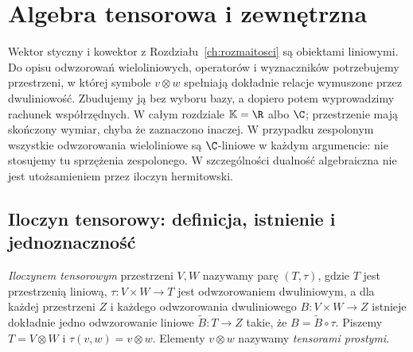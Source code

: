 \chapter{Algebra tensorowa i zewnętrzna}
\label{ch:algebra-tensorowa}

Wektor styczny i kowektor z Rozdziału~\ref{ch:rozmaitosci} są obiektami
liniowymi. Do opisu odwzorowań wieloliniowych, operatorów i
wyznaczników potrzebujemy przestrzeni, w której symbole
$v\otimes w$ spełniają dokładnie relacje wymuszone przez dwuliniowość.
Zbudujemy ją bez wyboru bazy, a dopiero potem wyprowadzimy rachunek
współrzędnych. W całym rozdziale $\mathbb K=\R$ albo $\C$;
przestrzenie mają skończony wymiar, chyba że zaznaczono inaczej.
W przypadku zespolonym wszystkie odwzorowania wieloliniowe są
$\C$-liniowe w każdym argumencie: nie stosujemy tu sprzężenia
zespolonego. W szczególności dualność algebraiczna nie jest
utożsamieniem przez iloczyn hermitowski.

\section{Iloczyn tensorowy: definicja, istnienie i jednoznaczność}
\label{sec:iloczyn-tensorowy}

\begin{definicja}
\label{def:tensor-universal}
\emph{Iloczynem tensorowym} przestrzeni $V,W$ nazywamy parę
$(T,\tau)$, gdzie $T$ jest przestrzenią liniową,
$\tau\colon V\times W\to T$ jest odwzorowaniem dwuliniowym,
a dla każdej przestrzeni $Z$ i każdego odwzorowania dwuliniowego
$B\colon V\times W\to Z$ istnieje dokładnie jedno odwzorowanie
liniowe $\widetilde B\colon T\to Z$ takie, że
$B=\widetilde B\circ\tau$. Piszemy $T=V\otimes W$ i
$\tau(v,w)=v\otimes w$. Elementy $v\otimes w$ nazywamy
\emph{tensorami prostymi}.
\end{definicja}

\begin{center}
\end{center}

